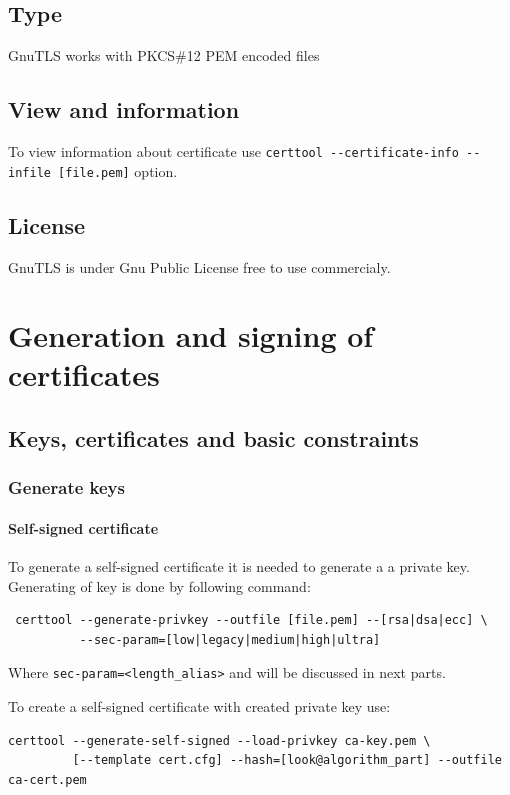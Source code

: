 \documentclass[10pt, a4paper]{report}
\begin{document}
  \subsection{Type}
GnuTLS works with PKCS\#12 PEM encoded files
  \subsection{View and information}
To view information about certificate use \verb+certtool --certificate-info --infile [file.pem]+ option.
  \subsection{License}
GnuTLS is under Gnu Public License \- free to use commercialy.
  
\section{Generation and signing of certificates}

  \subsection{Keys, certificates and basic constraints}
  
    \subsubsection{Generate keys}
    
      \paragraph{Self-signed certificate}
To generate a self-signed certificate it is needed to generate a a private key. Generating of key is done by following command:
\begin{verbatim}
 certtool --generate-privkey --outfile [file.pem] --[rsa|dsa|ecc] \
          --sec-param=[low|legacy|medium|high|ultra]
\end{verbatim}
Where \verb+sec-param=<length_alias>+ and will be discussed in next parts.

To create a self-signed certificate with created private key use:
\begin{verbatim}
certtool --generate-self-signed --load-privkey ca-key.pem \
         [--template cert.cfg] --hash=[look@algorithm_part] --outfile ca-cert.pem
\end{verbatim}
\end{document}
